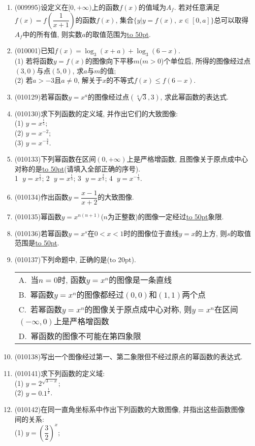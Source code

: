 \documentclass[10pt,a4paper]{article}
\newcommand{\blank}[1]{\underline{\hbox to #1pt{}}}
\newcommand{\bracket}[1]{(\hbox to #1pt{})}
\newcommand{\onech}[4]{\par\begin{tabular}{p{.9\textwidth}}
A.~#1\\
B.~#2\\
C.~#3\\
D.~#4
\end{tabular}}
\begin{document}
\begin{enumerate}[1.]
\item {\tiny (009995)}设定义在$[0,+\infty)$上的函数$f(x)$的值域为$A_f$. 若对任意满足$f(x)=f(\dfrac 1{x+1})$的函数$f(x)$, 集合$\{y|y=f(x), \ x\in [0,a]\}$总可以取得$A_f$中的所有值, 则实数$a$的取值范围为\blank{50}.
\item {\tiny (010001)}已知$f(x)=\log_3(x+a)+\log_3(6-x)$.\\
(1) 若将函数$y=f(x)$的图像向下平移$m$($m>0$)个单位后, 所得的图像经过点$(3,0)$与点$(5,0)$, 求$a$与$m$的值;\\
(2) 若$a>-3$且$a\ne 0$, 解关于$x$的不等式$f(x)\le f(6-x)$.
\item {\tiny (010129)}若幂函数$y=x^a$的图像经过点$(\sqrt[4]{3}, 3)$, 求此幂函数的表达式.
\item {\tiny (010130)}求下列函数的定义域, 并作出它们的大致图像:\\
(1) $y=x^\frac 15$;\\
(2) $y=x^{-2}$;\\
(3) $y=x^{-\frac 34}$.
\item {\tiny (010133)}下列幂函数在区间$(0, +\infty)$上是严格增函数, 且图像关于原点成中心对称的是\blank{50}(请填入全部正确的序号).\\
\textcircled{1} $y=x^\frac 12$; \textcircled{2} $y=x^\frac 13$; \textcircled{3} $y=x^\frac 23$; \textcircled{4} $y=x^{-\frac 13}$.
\item {\tiny (010134)}作出函数$y=\dfrac{x-1}{x+2}$的大致图像.
\item {\tiny (010135)}幂函数$y=x^{n(n+1)}$($n$为正整数)的图像一定经过\blank{50}象限.
\item {\tiny (010136)}若幂函数$y=x^s$在$0<x<1$时的图像位于直线$y=x$的上方, 则$s$的取值范围是\blank{50}.
\item {\tiny (010137)}下列命题中, 正确的是\bracket{20}.
\onech{当$n=0$时, 函数$y=x^n$的图像是一条直线}{幂函数$y=x^n$的图像都经过$(0, 0)$和$(1, 1)$两个点}{若幂函数$y=x^n$的图像关于原点成中心对称, 则$y=x^n$在区间$(-\infty, 0)$上是严格增函数}{幂函数的图像不可能在第四象限}
\item {\tiny (010138)}写出一个图像经过第一、第二象限但不经过原点的幂函数的表达式.
\item {\tiny (010141)}求下列函数的定义域:\\
(1) $y=2^{\sqrt{3-x}}$;\\
(2) $y=0.1^\frac 1x$.
\item {\tiny (010142)}在同一直角坐标系中作出下列函数的大致图像, 并指出这些函数图像间的关系:\\
(1) $y=(\dfrac 32)^x$;\\

\end{enumerate}
\end{document}
